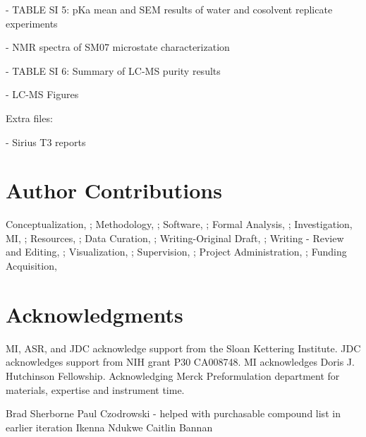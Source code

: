 \documentclass[9pt,lineno]{elife}
\begin{document}
- TABLE SI 5: pKa mean and SEM results of water and cosolvent replicate experiments

- NMR spectra of SM07 microstate characterization  

- TABLE SI 6: Summary of LC-MS purity results


- LC-MS Figures  


Extra files:  

- Sirius T3 reports  



\section{Author Contributions}

Conceptualization, ; Methodology, ; Software, ; Formal Analysis, ; Investigation, MI, ; Resources, ;  Data Curation, ; Writing-Original Draft, ; Writing - Review and Editing, ; Visualization, ; Supervision, ; Project Administration, ; Funding Acquisition, 


\section{Acknowledgments}

MI, ASR, and JDC acknowledge support from the Sloan Kettering Institute. JDC acknowledges support from NIH grant P30 CA008748. MI acknowledges Doris J. Hutchinson Fellowship. Acknowledging Merck Preformulation department for materials, expertise and instrument time.

Brad Sherborne  
Paul Czodrowski - helped with purchasable compound list in earlier iteration  
Ikenna Ndukwe  
Caitlin Bannan  

\end{document}
